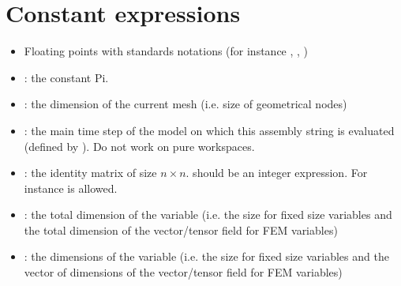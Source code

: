 \documentclass[a4paper,11pt,english]{sphinxmanual}
\begin{document}
\section{Constant expressions}
\label{\detokenize{userdoc/gasm_high:constant-expressions}}\begin{itemize}
\item {} 
Floating points with standards notations (for instance , , )

\item {} 
: the constant Pi.

\item {} 
: the dimension of the current mesh (i.e. size of geometrical nodes)

\item {} 
: the main time step of the model on which this assembly string is evaluated (defined by ). Do not work on pure workspaces.

\item {} 
: the identity matrix of size \(n\times n\).  should be an integer expression. For instance  is allowed.

\item {} 
: the total dimension of the variable  (i.e. the  size for fixed size variables and the total dimension of the vector/tensor field for FEM variables)

\item {} 
: the dimensions of the variable  (i.e. the size for fixed size variables and the vector of dimensions of the vector/tensor field for FEM variables)

\end{itemize}
\end{document}
